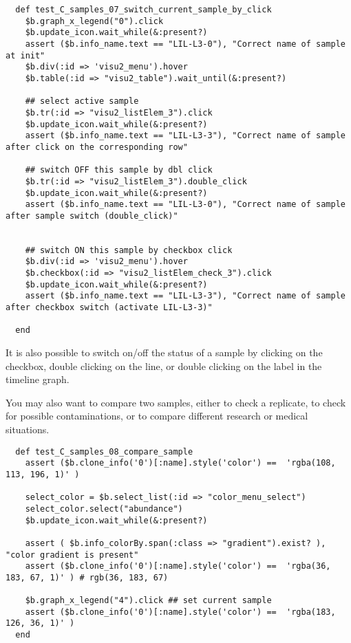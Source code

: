 \begin{verbatim}
  def test_C_samples_07_switch_current_sample_by_click
    $b.graph_x_legend("0").click
    $b.update_icon.wait_while(&:present?)
    assert ($b.info_name.text == "LIL-L3-0"), "Correct name of sample at init"
    $b.div(:id => 'visu2_menu').hover
    $b.table(:id => "visu2_table").wait_until(&:present?)

    ## select active sample
    $b.tr(:id => "visu2_listElem_3").click
    $b.update_icon.wait_while(&:present?)
    assert ($b.info_name.text == "LIL-L3-3"), "Correct name of sample after click on the corresponding row"

    ## switch OFF this sample by dbl click
    $b.tr(:id => "visu2_listElem_3").double_click
    $b.update_icon.wait_while(&:present?)
    assert ($b.info_name.text == "LIL-L3-0"), "Correct name of sample after sample switch (double_click)"
    

    ## switch ON this sample by checkbox click
    $b.div(:id => 'visu2_menu').hover
    $b.checkbox(:id => "visu2_listElem_check_3").click
    $b.update_icon.wait_while(&:present?)
    assert ($b.info_name.text == "LIL-L3-3"), "Correct name of sample after checkbox switch (activate LIL-L3-3)"
    
  end
\end{verbatim}
It is also possible to switch on/off the status of a sample by clicking on the checkbox, double clicking on the line, or double clicking on the label in the timeline graph.

\bigskip

You may also want to compare two samples, either to check a replicate, to check for possible contaminations, or to
compare different research or medical situations.

\begin{verbatim}
  def test_C_samples_08_compare_sample
    assert ($b.clone_info('0')[:name].style('color') ==  'rgba(108, 113, 196, 1)' )
    
    select_color = $b.select_list(:id => "color_menu_select")
    select_color.select("abundance")
    $b.update_icon.wait_while(&:present?)

    assert ( $b.info_colorBy.span(:class => "gradient").exist? ), "color gradient is present"
    assert ($b.clone_info('0')[:name].style('color') ==  'rgba(36, 183, 67, 1)' ) # rgb(36, 183, 67)

    $b.graph_x_legend("4").click ## set current sample
    assert ($b.clone_info('0')[:name].style('color') ==  'rgba(183, 126, 36, 1)' )
  end
\end{verbatim}

